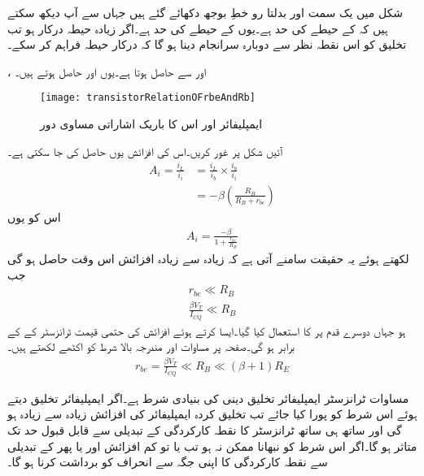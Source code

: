 شکل  میں یک سمت اور بدلتا رو خطِ بوجھ  دکھائے گئے ہیں جہاں سے آپ دیکھ سکتے ہیں کہ   کے حیطے کی حد   ہے۔یوں  کے حیطے کی حد  ہے۔اگر زیادہ حیطہ درکار ہو تب تخلیق کو اس نقطہ نظر سے دوبارہ سرانجام دینا ہو گا کہ  درکار حیطہ فراہم کر سکے۔

،  اور  سے  حاصل ہوتا ہے۔یوں  اور  حاصل ہوتے ہیں۔
\begin{figure}
\centering
\texttt{[image: transistorRelationOFrbeAndRb]}
\caption{ایمپلیفائر اور اس کا باریک اشاراتی مساوی دور}
\label{شکل_ٹرانزسٹر_افزائش_بڑھانے_کی_شرط}
\end{figure}
آئیں شکل  پر غور کریں۔اس کی افزائش  یوں حاصل کی جا سکتی ہے۔
\begin{align*}
A_i=\frac{i_L}{i_i}&= \frac{i_L}{i_b} \times \frac{i_b}{i_i}\\
&=-\beta \left(\frac{R_B}{R_B+r_{be}} \right)
\end{align*}
اس کو یوں
\begin{align*}
A_i=\frac{-\beta}{1+\frac{r_{be}}{R_B}}
\end{align*}
لکھتے ہوئے یہ حقیقت سامنے آتی ہے کہ زیادہ سے زیادہ افزائش اس وقت حاصل ہو گی جب
\begin{align}
r_{be} \ll R_B\\
\frac{\beta V_T}{I_{CQ}} \ll R_B
\end{align}
ہو جہاں دوسرے قدم پر  کا استعمال کیا گیا۔ایسا کرتے ہوئے افزائش کی حتمی قیمت ٹرانزسٹر کے  کے برابر ہو گی۔صفحہ  پر مساوات  اور مندرجہ بالا شرط کو اکٹھے لکھتے ہیں۔
\begin{align}\label{مساوات_ٹرانزسٹر_ایمپلیفائر_تخلیق_کی_شرط}
r_{be} =\frac{\beta V_T}{I_{CQ}} \ll R_B \ll \left(\beta+1\right) R_E
\end{align}

مساوات  ٹرانزسٹر ایمپلیفائر تخلیق دینی کی بنیادی شرط ہے۔اگر ایمپلیفائر تخلیق دیتے ہوئے اس شرط کو پورا کیا جائے تب تخلیق کردہ ایمپلیفائر کی افزائش زیادہ سے زیادہ ہو گی اور ساتھ ہی ساتھ ٹرانزسٹر کا نقطہ کارکردگی  کے تبدیلی سے قابل قبول حد تک متاثر ہو گا۔اگر اس شرط کو نبھانا ممکن نہ ہو تب یا تو کم افزائش  اور یا پھر  کے تبدیلی سے نقطہ کارکردگی کا اپنی جگہ سے انحراف کو برداشت کرنا ہو گا۔


